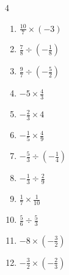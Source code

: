 \begin{multicols}{4}
\begin{enumerate}
  \item $\displaystyle \frac{10}{7}\times{}\left(-3\right)$


  \item $\displaystyle \frac{7}{8}\div{}\left(-\frac{1}{8}\right)$

        \phantom{$\displaystyle =-7$}

  \item $\displaystyle \frac{9}{7}\div{}\left(-\frac{5}{2}\right)$


  \item $\displaystyle -5\times{}\frac{4}{3}$


  \item $\displaystyle -\frac{2}{3}\times{}4$


  \item $\displaystyle -\frac{1}{5}\times{}\frac{4}{9}$


  \item $\displaystyle -\frac{5}{3}\div{}\left(-\frac{1}{4}\right)$


  \item $\displaystyle -\frac{1}{3}\div{}\frac{2}{9}$


  \item $\displaystyle \frac{1}{7}\times{}\frac{1}{10}$


\columnbreak %

  \item $\displaystyle \frac{5}{6}\div{}\frac{5}{3}$


  \item $\displaystyle -8\times{}\left(-\frac{3}{2}\right)$

        \phantom{$\displaystyle =12$}

  \item $\displaystyle -\frac{3}{2}\times{}\left(-\frac{2}{3}\right)$


\end{enumerate}
\end{multicols}
